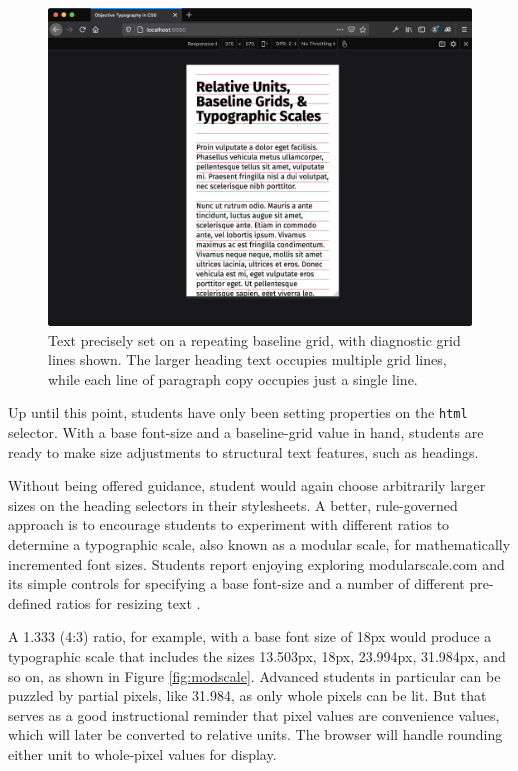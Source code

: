 \documentclass[sigplan,screen]{acmart}
\begin{document}
\begin{figure}
  \includegraphics[width=\linewidth]{rdv-narrow}
  \caption{Text precisely set on a repeating baseline grid, with diagnostic grid lines shown. The larger heading text occupies multiple grid lines, while each line of paragraph copy occupies just a single line.}
  \label{fig:rdv-narrow}
\end{figure}

Up until this point, students have only been setting properties on the \verb|html| selector. With a base font-size and a baseline-grid value in hand, students are ready to make size adjustments to structural text features, such as headings.

Without being offered guidance, student would again choose arbitrarily larger sizes on the heading selectors in their stylesheets. A better, rule-governed approach is to encourage students to experiment with different ratios to determine a typographic scale, also known as a modular scale, for mathematically incremented font sizes. Students report enjoying exploring modularscale.com and its simple controls for specifying a base font-size and a number of different pre-defined ratios for resizing text \cite{modscale}.

A 1.333 (4:3) ratio, for example, with a base font size of 18px would produce a typographic scale that includes the sizes 13.503px, 18px, 23.994px, 31.984px, and so on, as shown in Figure \ref{fig:modscale}. Advanced students in particular can be puzzled by partial pixels, like 31.984, as only whole pixels can be lit. But that serves as a good instructional reminder that pixel values are convenience values, which will later be converted to relative units. The browser will handle rounding  either unit to whole-pixel values for display.
\end{document}
